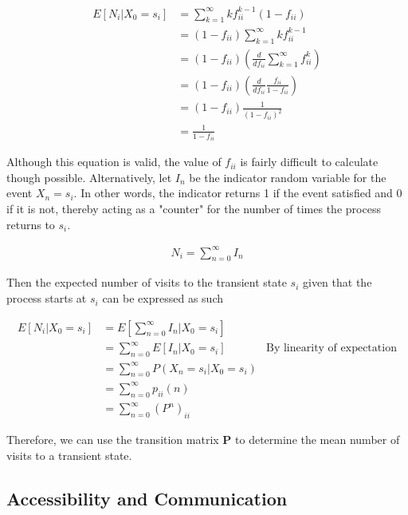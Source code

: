 \documentclass[a4paper, 12pt]{article}
\begin{document}
	\begin{equation*}
		\begin{aligned}
			E[N_i|X_0 = s_i] &= \sum_{k=1}^\infty kf_{ii}^{k-1}(1-f_{ii}) \\
							&= (1-f_{ii})\sum_{k=1}^\infty kf_{ii}^{k-1} \\
							&= (1-f_{ii}) (\frac{d}{df_{ii}} \sum_{k=1}^\infty f_{ii}^{k}) \\
							&= (1-f_{ii}) (\frac{d}{df_{ii}} \frac{f_{ii}}{1-f_{ii}}) \\
							&= (1-f_{ii}) \frac{1}{(1-f_{ii})^2} \\
							&= \frac{1}{1-f_{ii}}\
		\end{aligned}
	\end{equation*}	
	
	Although this equation is valid, the value of $f_{ii}$ is fairly difficult to calculate though possible. Alternatively, let $I_n$ be the indicator random variable for the event $X_n=s_i$. In other words, the indicator returns 1 if the event satisfied and 0 if it is not, thereby acting as a "counter" for the number of times the process returns to $s_i$.
	
	\begin{equation*}
	\begin{aligned}
		 N_i = \sum_{n=0}^\infty I_n
	\end{aligned}
	\end{equation*}	
	
	 Then the expected number of visits to the transient state $s_i$ given that the process starts at $s_i$ can be expressed as such
	
	
	\begin{equation*}
	\begin{aligned}
		 E[N_i|X_0 = s_i] &= E\left[\sum_{n=0}^\infty I_n | X_0 = s_i\right] \\
		 				  &= \sum_{n=0}^\infty E\left[I_n | X_0 = s_i\right] &\text{By linearity of expectation}\\
		 				  &= \sum_{n=0}^\infty P(X_n = s_i | X_0 = s_i) \\
		 				  &= \sum_{n=0}^\infty p_{ii}(n) \\
		 				  &= \sum_{n=0}^\infty (P^n)_{ii}
	\end{aligned}
	\end{equation*}	
	
Therefore, we can use the transition matrix \textbf{P} to determine the mean number of visits to a transient state.

\subsection*{Accessibility and Communication}
\end{document}
